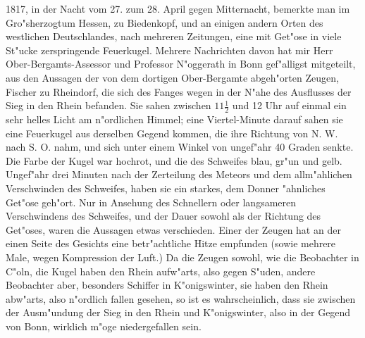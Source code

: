 \documentclass[a4paper, 11pt, oneside, polutonikogreek, german]{article}
\begin{document}
1817, in der Nacht vom 27. zum 28. April gegen Mitternacht, bemerkte man im Gro"sherzogtum Hessen, zu Biedenkopf, und an einigen andern Orten des westlichen Deutschlandes, nach mehreren Zeitungen, eine mit Get"ose in viele St"ucke zerspringende Feuerkugel. Mehrere Nachrichten davon hat mir Herr Ober-Bergamts-Assessor und Professor N"oggerath in Bonn gef"alligst mitgeteilt, aus den Aussagen der von dem dortigen Ober-Bergamte abgeh"orten Zeugen, Fischer zu Rheindorf, die sich des Fanges wegen in der N"ahe des Ausflusses der Sieg in den Rhein befanden. Sie sahen zwischen $\mathfrak{11\frac{1}{2}}$ und 12 Uhr auf einmal ein sehr helles Licht am n"ordlichen Himmel; eine Viertel-Minute darauf sahen sie eine Feuerkugel aus derselben Gegend kommen, die ihre Richtung von N. W. nach S. O. nahm, und sich unter einem Winkel von ungef"ahr 40 Graden senkte. Die Farbe der Kugel war hochrot, und die des Schweifes blau, gr"un und gelb. Ungef"ahr drei Minuten nach der Zerteilung des Meteors und dem allm"ahlichen Verschwinden des Schweifes, haben sie ein starkes, dem Donner "ahnliches Get"ose geh"ort. Nur in Ansehung des Schnellern oder langsameren Verschwindens des Schweifes, und der Dauer sowohl als der Richtung des Get"oses, waren die Aussagen etwas verschieden. Einer der Zeugen hat an der einen Seite des Gesichts eine betr"achtliche Hitze empfunden (sowie mehrere Male, wegen Kompression der Luft.) Da die Zeugen sowohl, wie die Beobachter in C"oln, die Kugel haben den Rhein aufw"arts, also gegen S"uden, andere Beobachter aber, besonders Schiffer in K"onigswinter, sie haben den Rhein abw"arts, also n"ordlich fallen gesehen, so ist es wahrscheinlich, dass sie zwischen der Ausm"undung der Sieg in den Rhein und K"onigswinter, also in der Gegend von Bonn, wirklich m"oge niedergefallen sein.
\end{document}
